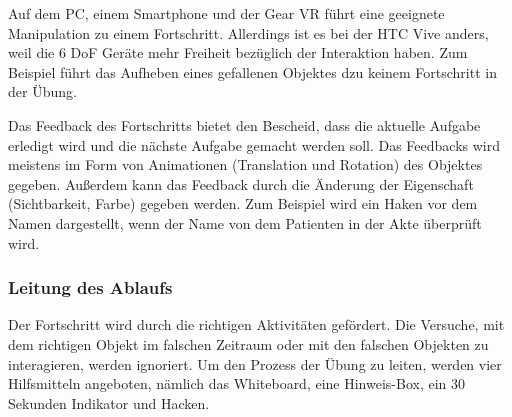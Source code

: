   Auf dem PC, einem Smartphone und der Gear VR führt eine geeignete Manipulation zu einem Fortschritt. Allerdings ist es bei der HTC Vive anders, weil die 6 DoF Geräte mehr Freiheit bezüglich der Interaktion haben. Zum Beispiel führt das Aufheben eines gefallenen Objektes dzu keinem Fortschritt in der Übung. 
  
  Das Feedback des Fortschritts bietet den Bescheid, dass die aktuelle Aufgabe erledigt wird und die nächste Aufgabe gemacht werden soll. Das Feedbacks wird meistens im Form von Animationen (Translation und Rotation) des Objektes gegeben. Außerdem kann das Feedback durch die Änderung der Eigenschaft (Sichtbarkeit, Farbe) gegeben werden. Zum Beispiel wird ein Haken vor dem Namen dargestellt, wenn der Name von dem Patienten in der Akte überprüft wird.
  
  \subsubsection{Leitung des Ablaufs}
  Der Fortschritt wird durch die richtigen Aktivitäten gefördert. Die Versuche, mit dem richtigen Objekt im falschen Zeitraum oder mit den falschen Objekten zu interagieren, werden ignoriert. Um den Prozess der Übung zu leiten, werden vier Hilfsmitteln angeboten, nämlich das Whiteboard, eine Hinweis-Box, ein 30 Sekunden Indikator und Hacken.
